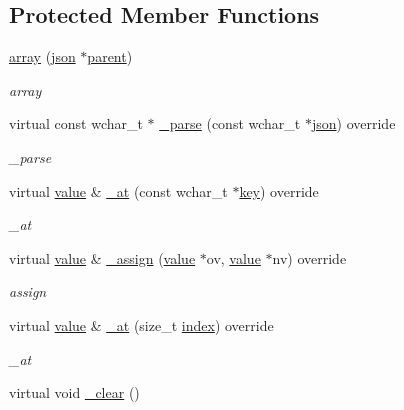 \subsection*{Protected Member Functions}
\begin{DoxyCompactItemize}
\item 
\hyperlink{classformat_1_1array_a8f03c24948af29fa798f556a9689828c}{array} (\hyperlink{classformat_1_1json}{json} $\ast$\hyperlink{classformat_1_1value_a86c03ec8810bfd0d60ec49095120040d}{parent})
\begin{DoxyCompactList}\small\item\em array \end{DoxyCompactList}\item 
virtual const wchar\+\_\+t $\ast$ \hyperlink{classformat_1_1array_a7bd1454afcf365128e2a5db112b2895f}{\+\_\+parse} (const wchar\+\_\+t $\ast$\hyperlink{classformat_1_1json}{json}) override
\begin{DoxyCompactList}\small\item\em \+\_\+parse \end{DoxyCompactList}\item 
virtual \hyperlink{classformat_1_1value_aa6b85823936bf7b8ab78d3f8d443c00d}{value} \& \hyperlink{classformat_1_1array_a6e6822294f55273f657732d048aa38f8}{\+\_\+at} (const wchar\+\_\+t $\ast$\hyperlink{classformat_1_1value_ad4865e7984fc9f3b5ce7c17fd7ac740c}{key}) override
\begin{DoxyCompactList}\small\item\em \+\_\+at \end{DoxyCompactList}\item 
virtual \hyperlink{classformat_1_1value_aa6b85823936bf7b8ab78d3f8d443c00d}{value} \& \hyperlink{classformat_1_1array_a4407859f08e94c0d761dffd6eb4578f6}{\+\_\+assign} (\hyperlink{classformat_1_1value_aa6b85823936bf7b8ab78d3f8d443c00d}{value} $\ast$ov, \hyperlink{classformat_1_1value_aa6b85823936bf7b8ab78d3f8d443c00d}{value} $\ast$nv) override
\begin{DoxyCompactList}\small\item\em assign \end{DoxyCompactList}\item 
virtual \hyperlink{classformat_1_1value_aa6b85823936bf7b8ab78d3f8d443c00d}{value} \& \hyperlink{classformat_1_1array_a386fd4c0f2556459186db7f22df4128e}{\+\_\+at} (size\+\_\+t \hyperlink{classformat_1_1value_aaa429b28cc0edf5a3589b89a1820ad62}{index}) override
\begin{DoxyCompactList}\small\item\em \+\_\+at \end{DoxyCompactList}\item 
virtual void \hyperlink{classformat_1_1array_ac39a4a526a9101901f1712933793a4fd}{\+\_\+clear} ()\hypertarget{classformat_1_1array_ac39a4a526a9101901f1712933793a4fd}{}\label{classformat_1_1array_ac39a4a526a9101901f1712933793a4fd}


\end{DoxyCompactItemize}
